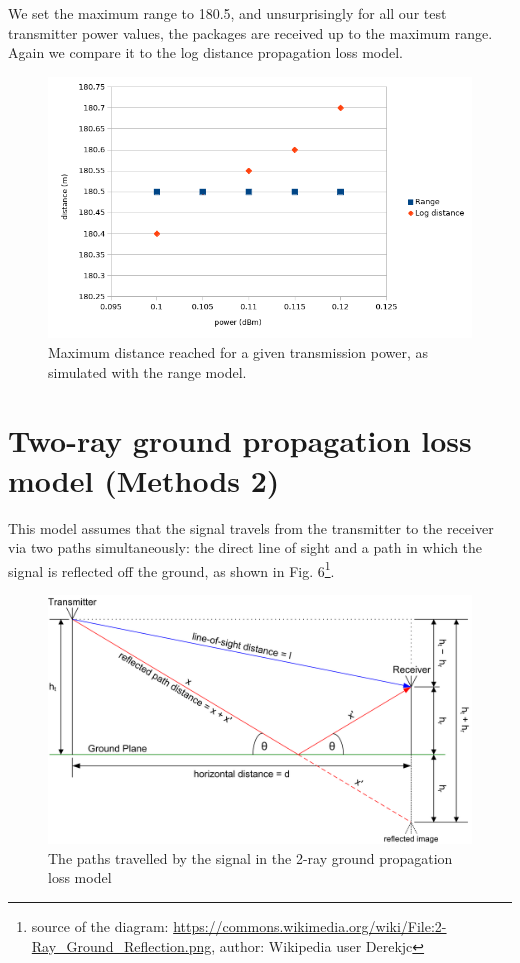 \documentclass[11pt,journal]{article}
\begin{document}
	We set the maximum range to 180.5, and unsurprisingly for all our test transmitter power values, the packages are received up to the maximum range. Again we compare it to the log distance propagation loss model.
	
	\begin{figure}[h]
		\centering
		\includegraphics[scale=0.6]{graph_range.png}
		\caption{Maximum distance reached for a given transmission power, as simulated with the range model.}
	\end{figure}

	\section{Two-ray ground propagation loss model\cite{two ray doc} (Methods 2)}
	This model assumes that the signal travels from the transmitter to the receiver via two paths simultaneously: the direct line of sight and a path in which the signal is reflected off the ground, as shown in Fig. 6\footnote{source of the diagram: \url{https://commons.wikimedia.org/wiki/File:2-Ray_Ground_Reflection.png}, author: Wikipedia user Derekjc}.
	
	\begin{figure}[h]
		\centering
		\includegraphics[scale=0.6]{2-Ray_Ground_Reflection.png}
		\caption{The paths travelled by the signal in the 2-ray ground propagation loss model }
	\end{figure}
\end{document}
